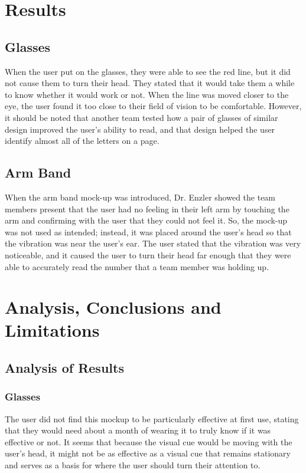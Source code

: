 \section{Results}

\subsection{Glasses}

When the user put on the glasses, they were able to see the red line, but it
did not cause them to turn their head. They stated that it would take them a
while to know whether it would work or not. When the line was moved closer to
the eye, the user found it too close to their field of vision to be
comfortable. However, it should be noted that another team tested how a pair of
glasses of similar design improved the user’s ability to read, and that design
helped the user identify almost all of the letters on a page.

\subsection{Arm Band}

When the arm band mock-up was introduced, Dr. Enzler showed the team members
present that the user had no feeling in their left arm by touching the arm and
confirming with the user that they could not feel it. So, the mock-up was not
used as intended; instead, it was placed around the user’s head so that the
vibration was near the user’s ear. The user stated that the vibration was very
noticeable, and it caused the user to turn their head far enough that they were
able to accurately read the number that a team member was holding up.

\section{Analysis, Conclusions and Limitations}

\subsection{Analysis of Results}

\subsubsection{Glasses}

The user did not find this mockup to be particularly effective at first use,
stating that they would need about a month of wearing it to truly know if it
was effective or not. It seems that because the visual cue would be moving with
the user’s head, it might not be as effective as a visual cue that remains
stationary and serves as a basis for where the user should turn their attention
to.

